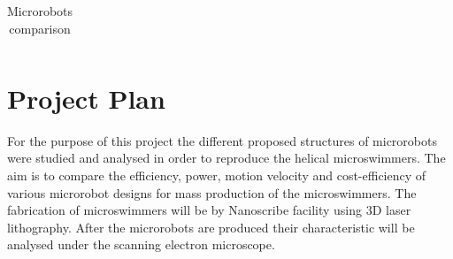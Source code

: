 \documentclass[a4paper,11pt]{article}
\begin{document}
\begin{sloppypar}
\begin{table}[h!]
\begin{tabular}{ c  m{3cm}  m{3cm} m{3cm} }
  \end{tabular}
  \caption{Microrobots comparison}\label{Micro}
\end{table}

\section{Project Plan}
For the purpose of this project the different proposed structures of microrobots were studied
 and analysed in order to reproduce the helical microswimmers. The aim is to compare
 the efficiency, power, motion velocity and cost-efficiency of various microrobot designs for mass production
 of the microswimmers. The fabrication of microswimmers will be by Nanoscribe facility using 3D laser
 lithography. After the microrobots are produced their characteristic will be analysed
 under the scanning electron microscope.





\nocite{vogtmann2013modeling}
\nocite{zeeshan2013hybrid}
\nocite{diller2013independent}
%




\end{sloppypar}
\end{document}
